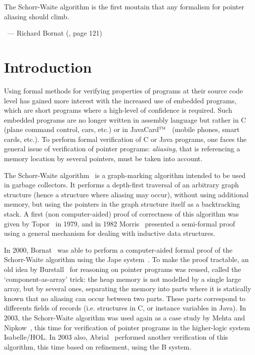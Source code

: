 


\hfill\begin{minipage}{0.42\textwidth}
\begin{slshape}
The Schorr-Waite algorithm is the first moutain that any formalism for
pointer aliasing should climb.
\end{slshape}

~\hfill --- Richard Bornat (\cite{bornat00mpc}, page 121)
\end{minipage}

\section{Introduction}

Using formal methods for verifying properties of programs at their
source code level has gained more interest with the increased use of
embedded programs, which are short programs where a high-level of
confidence is required. Such embedded programs are no longer written in
assembly language but rather in C (plane command control, cars, etc.) or in
JavaCard$^{\textsc{tm}}$~\cite{JavaCard} (mobile phones, smart cards, etc.).  To
perform formal verification of C or Java programs, one faces the
general issue of verification of pointer programs: \emph{aliasing},
that is referencing a memory location by several pointers, must be taken
into account. 

The Schorr-Waite algorithm~\cite{schorr67cacm} is a graph-marking
algorithm intended to be used in garbage collectors. It performs a
depth-first traversal of an arbitrary graph structure (hence a
structure where aliasing may occur), without using additional memory,
but using the pointers in the graph structure itself as a backtracking
stack. A first (non computer-aided) proof of correctness of this
algorithm was given by Topor~\cite{topor79acta} in 1979, and in 1982
Morris~\cite{morris82} presented a semi-formal proof using a general
mechanism for dealing with inductive data structures.


In 2000, Bornat~\cite{bornat00mpc} was able to perform a
computer-aided formal proof of the Schorr-Waite algorithm using the
Jape system~\cite{bornat99}. To make the proof tractable, an old idea
by Burstall~\cite{burstall72} for reasoning on pointer programs was
reused, called the `component-as-array' trick: the heap memory is not
modelled by a single large array, but by several ones, separating the
memory into parts where it is statically known that no aliasing can
occur between two parts. These parts correspond to differents fields
of records (i.e. structures in C, or instance variables in Java).  In
2003, the Schorr-Waite algorithm was used again as a case study by
Mehta and Nipkow~\cite{mehta03cade}, this time for verification of
pointer programs in the higher-logic system Isabelle/HOL. In 2003
also, Abrial~\cite{abrial03fme} performed another verification of this
algorithm, this time based on refinement, using the B system.

